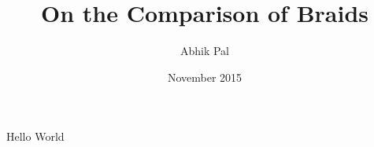 \documentclass{article}
\title{On the Comparison of Braids}
\author{Abhik Pal}
\date{November 2015}
\begin{document}
\maketitle

Hello World
\end{document}
